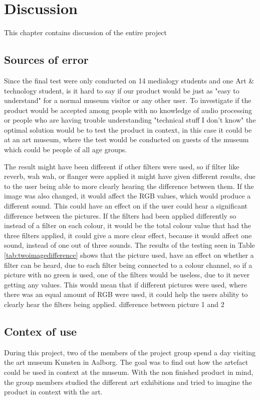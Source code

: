 \chapter{Discussion}\label{ch:discussion}
This chapter contains discussion of the entire project 

\section{Sources of error}

 Since the final test were only conducted on 14 medialogy students and one Art \& technology student, is it hard to say if our product would be just as "easy to understand" for a normal museum visitor or any other user. To investigate if the product would be accepted among people with no knowledge of audio processing or people who are having trouble understanding "technical stuff I don't know" the optimal solution would be to test the product in context, in this case it could be at an art museum, where the test would be conducted on guests of the museum which could be people of all age groups. 
 
 The result might have been different if other filters were used, so if filter like reverb, wah wah, or flanger were applied it might have given different results, due to the user being able to more clearly hearing the difference between them. If the image was also changed, it would affect the RGB values, which would produce a different sound. This could have an effect on if the user could hear a significant difference between the pictures.
 If the filters had been applied differently so instead of a filter on each colour, it would be the total colour value that had the three filters applied, it could give a more clear effect, because it would affect one sound, instead of one out of three sounds. 
 The results of the testing seen in Table \ref{tab:twoimagedifference} shows that the picture used, have an effect on whether a filter can be heard, due to each filter being connected to a colour channel, so if a picture with no green is used, one of the filters would be useless, due to it never getting any values. This would mean that if different pictures were used, where there was an equal amount of RGB were used, it could help the users ability to clearly hear the filters being applied. 
difference between picture 1 and 2
 
 \section{Contex of use}
During this project, two of the members of the project group spend a day visiting the art museum Kunsten in Aalborg. The goal was to find out how the artefact could be used in context at the museum. With the non finished product in mind, the group members studied the different art exhibitions and tried to imagine the product in context with the art. 

